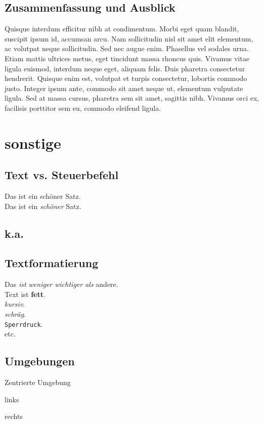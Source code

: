 \subsection{Zusammenfassung und Ausblick}
Quisque interdum efficitur nibh at condimentum. Morbi eget quam blandit, suscipit ipsum id, accumsan arcu. Nam sollicitudin nisl sit amet elit elementum, ac volutpat neque sollicitudin. Sed nec augue enim. Phasellus vel sodales urna. Etiam mattis ultrices metus, eget tincidunt massa rhoncus quis. Vivamus vitae ligula euismod, interdum neque eget, aliquam felis. Duis pharetra consectetur hendrerit. Quisque enim est, volutpat et turpis consectetur, lobortis commodo justo. Integer ipsum ante, commodo sit amet neque ut, elementum vulputate ligula. Sed at massa cursus, pharetra sem sit amet, sagittis nibh. Vivamus orci ex, facilisis porttitor sem eu, commodo eleifend ligula.

\section{sonstige}
\subsection{Text vs. Steuerbefehl}
Das ist ein schöner Satz.\\ Das ist ein \emph{schöner} Satz.
\subsection{k.a.}

\subsection{Textformatierung}
Das \emph{ist \emph{weniger wichtiger} als} andere.\\
Text ist \textbf{fett}.\\
\textit{kursiv}.\\
\textsl{schräg}.\\
\texttt{Sperrdruck}.\\
etc.

\subsection{Umgebungen}
\begin{center}
	Zentrierte Umgebung
\end{center}
\begin{flushleft}
	links
\end{flushleft}
\begin{flushright}
	rechts
\end{flushright}

